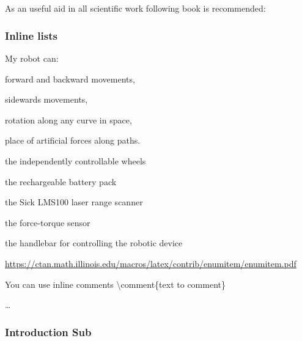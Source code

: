 \chapter{}
\label{sec:Introduction}

As an useful aid in all scientific work following book is recommended: \cite{deininger1992studienarbeiten}


\subsection{Inline lists}
My robot can:
\begin{enumerate*}[label=(\roman*)]
 \item forward and backward movements,
 \item sidewards movements,
 \item rotation along any curve in space,
 \item place of artificial forces along paths.
\end{enumerate*}

\begin{enumerate*}[label=(\arabic*),itemjoin={{; }}]
    \item the independently controllable wheels
    \item the rechargeable battery pack
    \item the Sick LMS100 laser range scanner
    \item the force-torque sensor
    \item the handlebar for controlling the robotic device
\end{enumerate*}

\url{https://ctan.math.illinois.edu/macros/latex/contrib/enumitem/enumitem.pdf}

You can use inline comments \textbackslash comment\{text to comment\}

\dots
{}
\Blindtext

\subsection{Introduction Sub}
\Blindtext
\Blindtext

